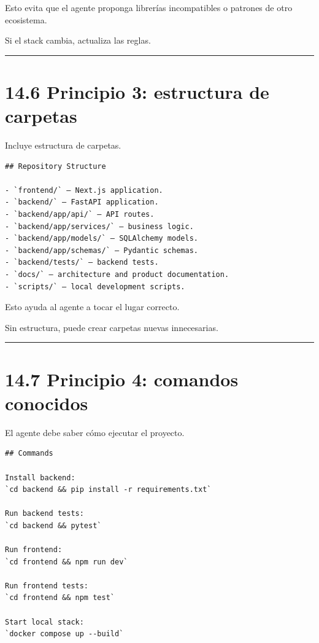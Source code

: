 Esto evita que el agente proponga librerías incompatibles o patrones de
otro ecosistema.

Si el stack cambia, actualiza las reglas.

\begin{center}\rule{0.5\linewidth}{0.5pt}\end{center}

\section{14.6 Principio 3: estructura de
carpetas}\label{principio-3-estructura-de-carpetas}

Incluye estructura de carpetas.

\begin{lstlisting}
## Repository Structure

- `frontend/` — Next.js application.
- `backend/` — FastAPI application.
- `backend/app/api/` — API routes.
- `backend/app/services/` — business logic.
- `backend/app/models/` — SQLAlchemy models.
- `backend/app/schemas/` — Pydantic schemas.
- `backend/tests/` — backend tests.
- `docs/` — architecture and product documentation.
- `scripts/` — local development scripts.
\end{lstlisting}

Esto ayuda al agente a tocar el lugar correcto.

Sin estructura, puede crear carpetas nuevas innecesarias.

\begin{center}\rule{0.5\linewidth}{0.5pt}\end{center}

\section{14.7 Principio 4: comandos
conocidos}\label{principio-4-comandos-conocidos}

El agente debe saber cómo ejecutar el proyecto.

\begin{lstlisting}
## Commands

Install backend:
`cd backend && pip install -r requirements.txt`

Run backend tests:
`cd backend && pytest`

Run frontend:
`cd frontend && npm run dev`

Run frontend tests:
`cd frontend && npm test`

Start local stack:
`docker compose up --build`
\end{lstlisting}

